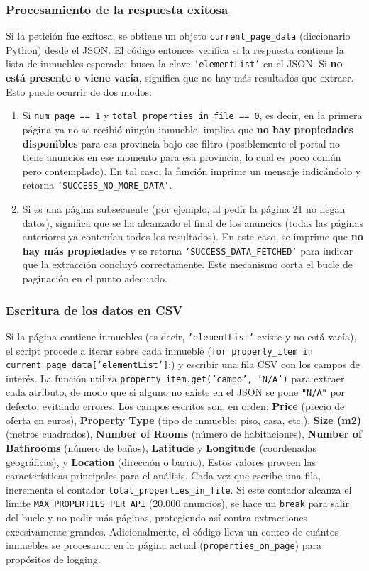 \documentclass[a4paper,11pt]{book}
\begin{document}
\subsubsection*{Procesamiento de la respuesta exitosa}
Si la petición fue exitosa, se obtiene un objeto \texttt{current\_page\_data} (diccionario Python) desde el JSON. El código entonces verifica si la respuesta contiene la lista de inmuebles esperada: busca la clave \texttt{'elementList'} en el JSON. Si \textbf{no está presente o viene vacía}, significa que no hay más resultados que extraer. Esto puede ocurrir de dos modos:
\begin{enumerate}
    \item Si \texttt{num\_page == 1} y \texttt{total\_properties\_in\_file == 0}, es decir, en la primera página ya no se recibió ningún inmueble, implica que \textbf{no hay propiedades disponibles} para esa provincia bajo ese filtro (posiblemente el portal no tiene anuncios en ese momento para esa provincia, lo cual es poco común pero contemplado). En tal caso, la función imprime un mensaje indicándolo y retorna \texttt{'SUCCESS\_NO\_MORE\_DATA'}.
    \item Si es una página subsecuente (por ejemplo, al pedir la página 21 no llegan datos), significa que se ha alcanzado el final de los anuncios (todas las páginas anteriores ya contenían todos los resultados). En este caso, se imprime que \textbf{no hay más propiedades} y se retorna \texttt{'SUCCESS\_DATA\_FETCHED'} para indicar que la extracción concluyó correctamente. Este mecanismo corta el bucle de paginación en el punto adecuado.
\end{enumerate}

\subsubsection*{Escritura de los datos en CSV}
Si la página contiene inmuebles (es decir, \texttt{'elementList'} existe y no está vacía), el script procede a iterar sobre cada inmueble (\texttt{for property\_item in current\_page\_data['elementList']}:) y escribir una fila CSV con los campos de interés. La función utiliza \texttt{property\_item.get('campo', 'N/A')} para extraer cada atributo, de modo que si alguno no existe en el JSON se pone \texttt{"N/A"} por defecto, evitando errores. Los campos escritos son, en orden: \textbf{Price} (precio de oferta en euros), \textbf{Property Type} (tipo de inmueble: piso, casa, etc.), \textbf{Size (m2)} (metros cuadrados), \textbf{Number of Rooms} (número de habitaciones), \textbf{Number of Bathrooms} (número de baños), \textbf{Latitude} y \textbf{Longitude} (coordenadas geográficas), y \textbf{Location} (dirección o barrio). Estos valores proveen las características principales para el análisis. Cada vez que escribe una fila, incrementa el contador \texttt{total\_properties\_in\_file}. Si este contador alcanza el límite \texttt{MAX\_PROPERTIES\_PER\_API} (20.000 anuncios), se hace un \texttt{break} para salir del bucle y no pedir más páginas, protegiendo así contra extracciones excesivamente grandes. Adicionalmente, el código lleva un conteo de cuántos inmuebles se procesaron en la página actual (\texttt{properties\_on\_page}) para propósitos de logging.
\end{document}
